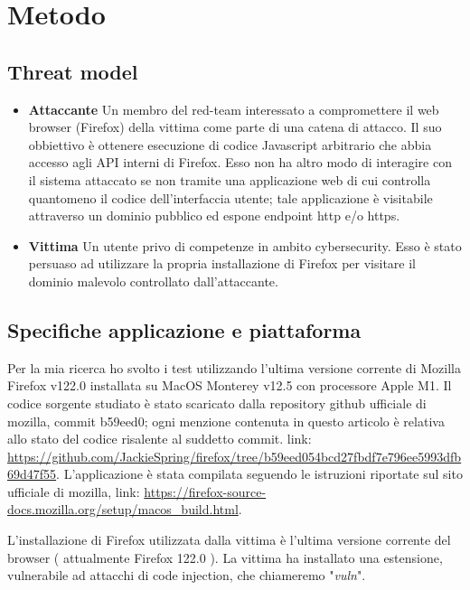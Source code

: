 \documentclass[]{./sapthesis/sapthesis}
\begin{document}
\newpage

\chapter{Metodo}
    \section{Threat model}
        \begin{itemize}
            \item \textbf{Attaccante} Un membro del red-team interessato a compromettere
                il web browser (Firefox) della vittima come parte di una catena di attacco.
                Il suo obbiettivo è ottenere esecuzione di codice Javascript arbitrario che abbia
                accesso agli API interni di Firefox.
                Esso non ha altro modo di interagire con il sistema attaccato se non tramite
                una applicazione web di cui controlla quantomeno il codice dell'interfaccia utente;
                tale applicazione è visitabile attraverso un dominio pubblico ed espone endpoint
                http e/o https.

            \item \textbf{Vittima} Un utente privo di competenze in ambito cybersecurity.
                Esso è stato persuaso ad utilizzare la propria installazione di Firefox
                per visitare il dominio malevolo controllato dall'attaccante.
        \end{itemize}

    \section{Specifiche applicazione e piattaforma}
        Per la mia ricerca ho svolto i test utilizzando l'ultima versione corrente di
        Mozilla Firefox v122.0 installata su MacOS Monterey v12.5 con processore Apple M1.
        Il codice sorgente studiato è stato scaricato dalla repository github ufficiale di mozilla,
        commit b59eed0; ogni menzione contenuta in questo articolo è relativa allo stato del codice
        risalente al suddetto commit. link: \url{https://github.com/JackieSpring/firefox/tree/b59eed054bcd27fbdf7e796ee5993dfb69d47f55}. 
        L'applicazione è stata compilata seguendo le istruzioni riportate sul sito
        ufficiale di mozilla, link: \url{https://firefox-source-docs.mozilla.org/setup/macos_build.html}.

        L'installazione di Firefox utilizzata dalla vittima è l'ultima versione corrente
        del browser ( attualmente Firefox 122.0 ). La vittima ha installato una estensione,
        vulnerabile ad attacchi di code injection, che chiameremo "\textit{vuln}".
\end{document}
